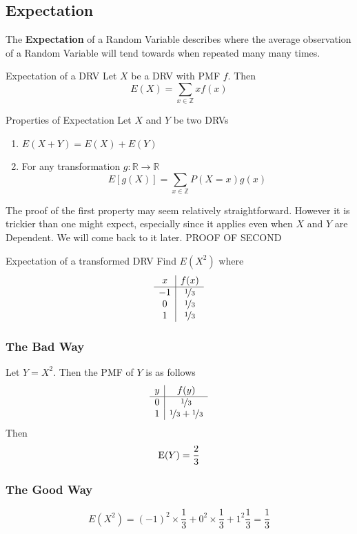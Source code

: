 \documentclass{report}
\begin{document}
\subsection{Expectation}
\newcommand{\E}{\text E}
The \textbf{Expectation} of a Random Variable describes where the average observation of a Random Variable will tend towards when repeated many many times.
\begin{definition}{Expectation of a DRV}
Let $X$ be a DRV with PMF $f$. Then
    \[
        E(X)=\sum_{x\in\mathbb Z} x f(x)
    \]
    
\end{definition}
\begin{theorem}{Properties of Expectation}
    Let $X$ and $Y$ be two DRVs
    \begin{enumerate}
        \item $E(X+Y)=E(X)+E(Y)$
        \item For any transformation $g:\mathbb R\to\mathbb R$
        \[
            E\left[g(X)\right] = \sum_{x\in \mathbb Z} P(X=x) g(x)
        \]
    \end{enumerate}
\tcblower
    The proof of the first property may seem relatively straightforward. However it is trickier than one might expect, especially since it applies even when $X$ and $Y$ are Dependent. We will come back to it later.
    \todo PROOF OF SECOND
\end{theorem}

\begin{example}{Expectation of a transformed DRV}
    Find $E(X^2)$ where
    \[
        \begin{array}{c|c}
             x & f(x) \\
             \hline
             -1 & \nicefrac 13\\
             0 & \nicefrac 13 \\
             1 & \nicefrac 13
        \end{array}
    \]
\tcblower
    \subsubsection*{The Bad Way}
    Let $Y=X^2$. Then the PMF of $Y$ is as follows
    \[
        \begin{array}{c|c}
             y & f(y) \\
             \hline
             0 & \nicefrac 13 \\
             1 & \nicefrac 13 + \nicefrac 13
        \end{array}
    \]
    Then 
    \[
        \E(Y)=\frac 23
    \]
    \subsubsection*{The Good Way}
    \[
        E(X^2)=(-1)^2\times \frac 13 + 0^2\times \frac 13 + 1^2 \frac 13 = \frac 13
    \]
\end{example}
\end{document}
